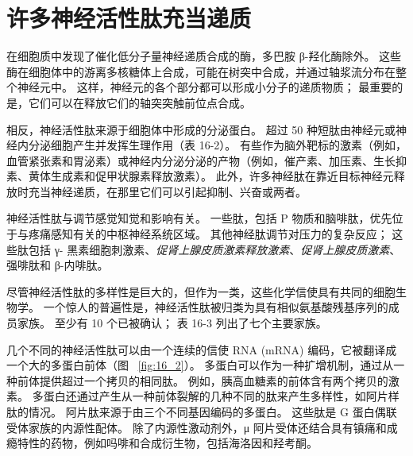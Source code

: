 \section{许多神经活性肽充当递质}

在细胞质中发现了催化低分子量神经递质合成的酶，多巴胺 β-羟化酶除外。
这些酶在细胞体中的游离多核糖体上合成，可能在树突中合成，并通过轴浆流分布在整个神经元中。
这样，神经元的各个部分都可以形成小分子的递质物质； 最重要的是，它们可以在释放它们的轴突突触前位点合成。


相反，神经活性肽来源于细胞体中形成的分泌蛋白。
超过 50 种短肽由神经元或神经内分泌细胞产生并发挥生理作用（表 16-2）。
有些作为脑外靶标的激素（例如，血管紧张素和胃泌素）或神经内分泌分泌的产物（例如，催产素、加压素、生长抑素、黄体生成素和促甲状腺素释放激素）。
此外，许多神经肽在靠近目标神经元释放时充当神经递质，在那里它们可以引起抑制、兴奋或两者。


神经活性肽与调节感觉知觉和影响有关。
一些肽，包括 P 物质和脑啡肽，优先位于与疼痛感知有关的中枢神经系统区域。
其他神经肽调节对压力的复杂反应；
这些肽包括 γ- 黑素细胞刺激素、\textit{促肾上腺皮质激素释放激素}、\textit{促肾上腺皮质激素}、强啡肽和 β-内啡肽。


尽管神经活性肽的多样性是巨大的，但作为一类，这些化学信使具有共同的细胞生物学。
一个惊人的普遍性是，神经活性肽被归类为具有相似氨基酸残基序列的成员家族。
至少有 10 个已被确认；
表 16-3 列出了七个主要家族。


几个不同的神经活性肽可以由一个连续的信使 RNA (mRNA) 编码，它被翻译成一个大的多蛋白前体（图 ~\ref{fig:16_2}）。
多蛋白可以作为一种扩增机制，通过从一种前体提供超过一个拷贝的相同肽。
例如，胰高血糖素的前体含有两个拷贝的激素。
多蛋白还通过产生从一种前体裂解的几种不同的肽来产生多样性，如阿片样肽的情况。
阿片肽来源于由三个不同基因编码的多蛋白。
这些肽是 G 蛋白偶联受体家族的内源性配体。
除了内源性激动剂外，μ 阿片受体还结合具有镇痛和成瘾特性的药物，例如吗啡和合成衍生物，包括海洛因和羟考酮。


